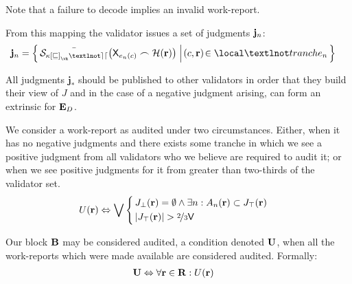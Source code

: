 Note that a failure to decode implies an invalid work-report.

From this mapping the validator issues a set of judgments $\mathbf{j}_{n}$:
\begin{align}
  \label{eq:judgments}
  \mathbf{j}\sub{n} &= \set{\build{
    \edsigndata{
      \activeset\subb{v}_\vk¬ed
    }{
      \Xvalidif{e\sub{n}(\cX)} \concat \blake{\wrX}
    }
  }{
    \tup{\cX, \wrX} \in \local¬tranche\sub{n}
  }}
\end{align}


All judgments $\mathbf{j}_*$ should be published to other validators in order that they build their view of $J$ and in the case of a negative judgment arising, can form an extrinsic for $\mathbf{E}_D$.

We consider a work-report as audited under two circumstances. Either, when it has no negative judgments and there exists some tranche in which we see a positive judgment from all validators who we believe are required to audit it; or when we see positive judgments for it from greater than two-thirds of the validator set.
\begin{align}
  U(\wrX) &\Leftrightarrow \bigvee\,\abracegroup[\,]{
    &J_\bot(\wrX) = \emptyset \wedge \exists n : A\sub{n}(\wrX) \subset J_\top(\wrX) \\
    &\len{J_\top(\wrX)} > \twothirds\Cvalcount
  }
\end{align}

Our block $\mathbf{B}$ may be considered audited, a condition denoted $\mathbf{U}$, when all the work-reports which were made available are considered audited. Formally:
\begin{align}
  \mathbf{U} &\Leftrightarrow \forall \mathbf{r} \in \mathbf{R} : U(\mathbf{r})
\end{align}

